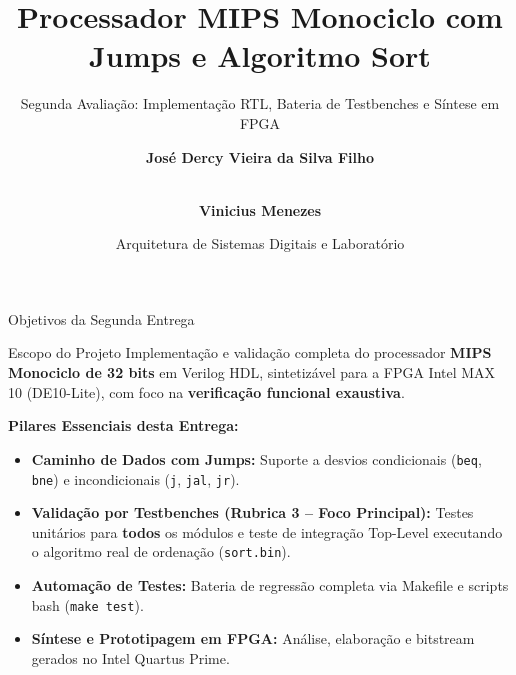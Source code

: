 \documentclass[aspectratio=169, 11pt]{beamer}
\title[MIPS Monociclo -- Validação e Testes]{Processador MIPS Monociclo com Jumps e Algoritmo Sort}
\subtitle{Segunda Avaliação: Implementação RTL, Bateria de Testbenches e Síntese em FPGA}
\author[Dercy, Vinicius]{%
  \textbf{José Dercy Vieira da Silva Filho} \and \\
  \textbf{Vinicius Menezes}%
}
\institute[UFAM / FEEC]{%
  Faculdade de Engenharia Elétrica e da Computação -- FEEC \\
  Universidade Federal do Amazonas -- UFAM
}
\date[Outubro 2026]{Arquitetura de Sistemas Digitais e Laboratório}
\begin{document}
\begin{frame}
  \titlepage
\end{frame}

\begin{frame}{Objetivos da Segunda Entrega}
  \begin{block}{Escopo do Projeto}
    Implementação e validação completa do processador \textbf{MIPS Monociclo de 32 bits} em Verilog HDL, sintetizável para a FPGA Intel MAX 10 (DE10-Lite), com foco na \textbf{verificação funcional exaustiva}.
  \end{block}

  \vspace{0.3cm}
  \textbf{Pilares Essenciais desta Entrega:}
  \begin{itemize}\setlength{\itemsep}{7pt}
    \item \textbf{Caminho de Dados com Jumps:} Suporte a desvios condicionais (\texttt{beq}, \texttt{bne}) e incondicionais (\texttt{j}, \texttt{jal}, \texttt{jr}).
    \item \textbf{Validação por Testbenches (Rubrica 3 -- Foco Principal):} Testes unitários para \textbf{todos} os módulos e teste de integração Top-Level executando o algoritmo real de ordenação (\texttt{sort.bin}).
    \item \textbf{Automação de Testes:} Bateria de regressão completa via Makefile e scripts bash (\texttt{make test}).
    \item \textbf{Síntese e Prototipagem em FPGA:} Análise, elaboração e bitstream gerados no Intel Quartus Prime.
  \end{itemize}
\end{frame}
\end{document}
